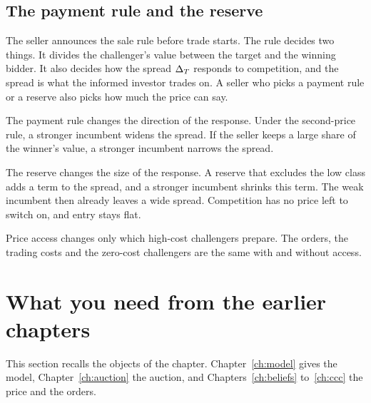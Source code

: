 \subsection*{The payment rule and the reserve}

The seller announces the sale rule before trade starts. The rule decides two things. It divides the challenger's value
between the target and the winning bidder. It also decides how the spread \(\Delta_T\) responds to competition, and the
spread is what the informed investor trades on. A seller who picks a payment rule or a reserve also picks how much
the price can say.

The payment rule changes the direction of the response. Under the second-price rule, a stronger incumbent widens the
spread. If the seller keeps a large share of the winner's value, a stronger incumbent narrows the spread.

The reserve changes the size of the response. A reserve that excludes the low class adds a term to the spread, and a
stronger incumbent shrinks this term. The weak incumbent then already leaves a wide spread. Competition has no price
left to switch on, and entry stays flat.

\begin{keyidea}
Price access changes only which high-cost challengers prepare. The orders, the trading costs and the zero-cost
challengers are the same with and without access.
\end{keyidea}

\section{What you need from the earlier chapters}\label{sec:welfare-setup}

This section recalls the objects of the chapter. Chapter~\ref{ch:model} gives the model, Chapter~\ref{ch:auction}
the auction, and Chapters~\ref{ch:beliefs} to~\ref{ch:ccc} the price and the orders.

